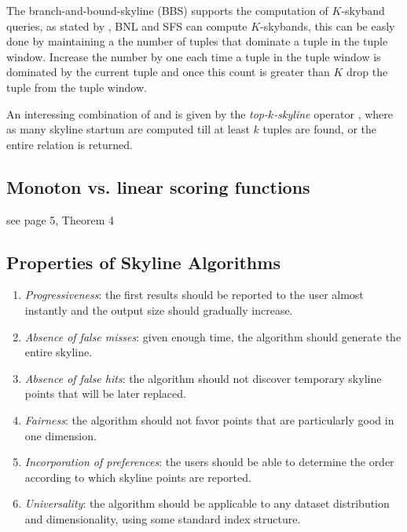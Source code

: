 The branch-and-bound-skyline (BBS) \citep{Papadias2005} supports the computation of $K$-skyband queries, as stated by \citet{Papadias2005}, BNL and SFS can compute $K$-skybands, this can be easly done by maintaining a the number of tuples that dominate a tuple in the tuple window. Increase the number by one each time a tuple in the tuple window is dominated by the current tuple and once this count is greater than $K$ drop the tuple from the tuple window.


An interessing combination of  and  is given by the \emph{top-$k$-skyline} operator , where as many skyline startum are computed till at least $k$ tuples are found, or the entire relation is returned.


\subsection{Monoton vs. linear scoring functions}\label{subsec:scoring}
see \citep{Chomicki2002a} page 5, Theorem 4

\subsection{Properties of Skyline Algorithms}


\begin{enumerate}
\item \emph{Progressiveness}: the first results should be reported to the user almost instantly and the output size should gradually increase.

\item \emph{Absence of false misses}: given enough time, the algorithm should generate the entire skyline.

\item \emph{Absence of false hits}: the algorithm should not discover temporary skyline points that will be later replaced.

\item \emph{Fairness}: the algorithm should not favor points that are particularly good in one dimension.

\item \emph{Incorporation of preferences}: the users should be able to determine the order according to which skyline points are reported.

\item \emph{Universality}: the algorithm should be applicable to any dataset distribution and dimensionality, using some standard index structure.
\end{enumerate}


